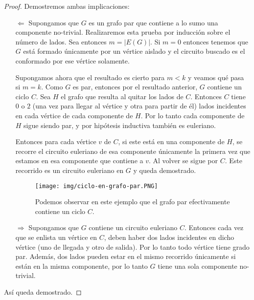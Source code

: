 \begin{proof}
    Demostremos ambas implicaciones:
    
    \begin{enumerate}
        \item[$\Leftarrow$] Supongamos que $G$ es un grafo par que contiene a lo sumo una componente no-trivial. Realizaremos esta prueba por inducción sobre el número de lados. Sea entonces $m = |E(G)|$. Si $m = 0$ entonces tenemos que $G$ está formado únicamente por un vértice aislado y el circuito buscado es el conformado por ese vértice solamente.
        
        Supongamos ahora que el resultado es cierto para $m < k$ y veamos qué pasa si $m = k$. Como $G$ es par, entonces por el resultado anterior, $G$ contiene un ciclo $C$. Sea $H$ el grafo que resulta al quitar los lados de $C$. Entonces $C$ tiene $0$ o $2$ (una vez para llegar al vértice y otra para partir de él) lados incidentes en cada vértice de cada componente de $H$. Por lo tanto cada componente de $H$ sigue siendo par, y por hipótesis inductiva también es euleriano.
        
        Entonces para cada vértice $v$ de $C$, si este está en una componente de $H$, se recorre el circuito euleriano de esa componente únicamente la primera vez que estamos en esa componente que contiene a $v$. Al volver se sigue por $C$. Este recorrido es un circuito euleriano en $G$ y queda demostrado.
        
        \begin{figure}
            \centering
            \texttt{[image: img/ciclo-en-grafo-par.PNG]}
            \caption{Podemos observar en este ejemplo que el grafo par efectivamente contiene un ciclo $C$.}
        \end{figure}
        
        \item[$\Rightarrow$] Supongamos que $G$ contiene un circuito euleriano $C$. Entonces cada vez que se enlista un vértice en $C$, deben haber dos lados incidentes en dicho vértice (uno de llegada y otro de salida). Por lo tanto todo vértice tiene grado par. Además, dos lados pueden estar en el mismo recorrido únicamente si están en la misma componente, por lo tanto $G$ tiene una sola componente no-trivial.
    \end{enumerate}
    
    Así queda demostrado.
\end{proof}

